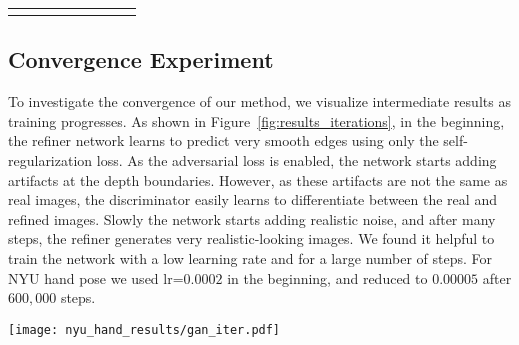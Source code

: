\documentclass[10pt,twocolumn,letterpaper]{article}
\begin{document}
\begin{figure*}
\begin{tabular}{cccccccc}
\hline  \\
\end{tabular}
\caption{Qualitative results for automatic refinement of NYU hand depth images. The top row (in each set of two rows) shows the synthetic hand image, and the bottom row is the corresponding refined image. Note how realistic the depth boundaries are compared to real images in Figure~\ref{fig:ex_real_nyu_hand}.}
\label{fig:more_results_qualitative_hand}
\end{figure*}

\subsection*{Convergence Experiment}
To investigate the convergence of our method, we visualize intermediate results as training progresses. 
As shown in Figure~\ref{fig:results_iterations}, in the beginning, the refiner network learns to predict very smooth edges using only the self-regularization loss. 
As the adversarial loss is enabled, the network starts adding artifacts at the depth boundaries. 
However, as these artifacts are not the same as real images, the discriminator easily learns to differentiate between the real and refined images. 
Slowly the network starts adding realistic noise, and after many steps, the refiner generates very realistic-looking images. 
We found it helpful to train the network with a low learning rate and for a large number of steps. 
For NYU hand pose we used lr=$0.0002$ in the beginning, and reduced to $0.00005$ after $600,000$ steps.


\begin{figure*}
\centering
\texttt{[image: nyu\_hand\_results/gan\_iter.pdf]} 
\caption{
SimGAN output as a function of training iterations for NYU hand pose.  
Columns correspond to increasing training iterations. 
First row shows synthetic images, and the second row shows corresponding refined images.
The first column is the result of training with $\ell_1$ image difference for $300$ steps; the later rows show the result when trained on top of this model. 
In the beginning the adversarial part of the cost introduces different kinds of unrealistic noise to try beat the adversarial network $D_{\boldsymbol \phi}$. 
As the dueling between $R_{\boldsymbol \theta}$ and $D_{\boldsymbol \phi}$ progresses, $R_{\boldsymbol \theta}$ learns to model the right kind of noise.}
\vspace{0.2cm}
\label{fig:results_iterations}
\end{figure*}
 
\end{document}
